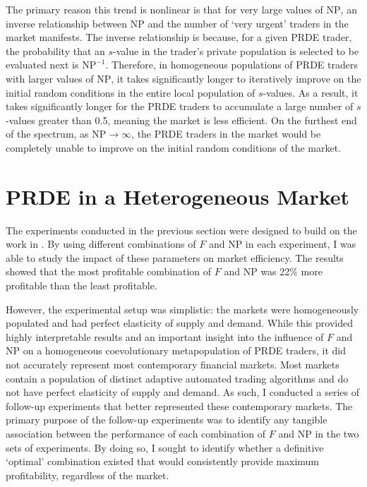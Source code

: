\documentclass[conference]{IEEEtran}
\begin{document}
The primary reason this trend is nonlinear is that for very large values of $\mathrm{NP}$, an inverse relationship between $\mathrm{NP}$ and the number of `very urgent' traders in the market manifests.
The inverse relationship is because, for a given PRDE trader, the probability that an $s$-value in the trader's private population is selected to be evaluated next is $\mathrm{NP}^{-1}$.
Therefore, in homogeneous populations of PRDE traders with larger values of $\mathrm{NP}$, it takes significantly longer to iteratively improve on the initial random conditions in the entire local population of $s$-values.
As a result, it takes significantly longer for the PRDE traders to accumulate a large number of $s$-values greater than 0.5, meaning the market is less efficient.
On the furthest end of the spectrum, as $\mathrm{NP}\to\infty$, the PRDE traders in the market would be completely unable to improve on the initial random conditions of the market.

\section{PRDE in a Heterogeneous Market}

The experiments conducted in the previous section were designed to build on the work in \cite{PRDE}.
By using different combinations of $F$ and $\mathrm{NP}$ in each experiment, I was able to study the impact of these parameters on market efficiency.
The results showed that the most profitable combination of $F$ and $\mathrm{NP}$ was 22\% more profitable than the least profitable.

However, the experimental setup was simplistic: the markets were homogeneously populated and had perfect elasticity of supply and demand.
While this provided highly interpretable results and an important insight into the influence of $F$ and $\mathrm{NP}$ on a homogeneous coevolutionary metapopulation of PRDE traders, it did not accurately represent most contemporary financial markets.
Most markets contain a population of distinct adaptive automated trading algorithms and do not have perfect elasticity of supply and demand.
As such, I conducted a series of follow-up experiments that better represented these contemporary markets. 
The primary purpose of the follow-up experiments was to identify any tangible association between the performance of each combination of $F$ and $\mathrm{NP}$ in the two sets of experiments.
By doing so, I sought to identify whether a definitive `optimal' combination existed that would consistently provide maximum profitability, regardless of the market.
\end{document}
